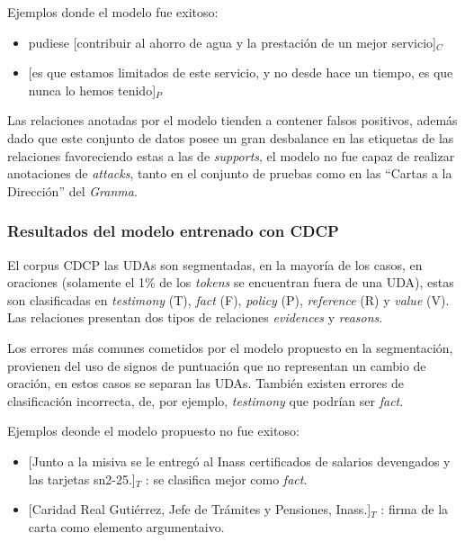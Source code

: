 \documentclass{rcci} %
\begin{document}
Ejemplos donde el modelo fue exitoso:
\begin{itemize}
	\item pudiese [contribuir al ahorro de agua y la prestaci\'on de un mejor servicio]$_C$ %
	\item \text{} [es que estamos limitados de este servicio, y no desde hace un tiempo, es que nunca lo hemos tenido]$_P$ %
\end{itemize}

Las relaciones anotadas por el modelo tienden a contener falsos positivos, adem\'as
dado que este conjunto de datos posee un gran desbalance en las etiquetas de las relaciones favoreciendo 
estas a las de \textit{supports}, el modelo no fue capaz de realizar anotaciones de \textit{attacks}, tanto en 
el conjunto de pruebas como en las ``Cartas a la Direcci\'on'' del \textit{Granma}.

\subsubsection*{Resultados del modelo entrenado con CDCP}

El corpus CDCP las UDAs son segmentadas, en la mayor\'ia de los casos, en oraciones 
(solamente el 1\% de los \textit{tokens} se encuentran fuera de una UDA),
estas son clasificadas en \textit{testimony} (T), \textit{fact} (F), \textit{policy} (P), \textit{reference} (R)
y \textit{value} (V). Las relaciones presentan dos tipos de relaciones \textit{evidences} y \textit{reasons}.

Los errores m\'as comunes cometidos por el modelo propuesto en la segmentaci\'on, provienen del uso 
de signos de puntuaci\'on que no representan un cambio de oraci\'on, en estos casos se separan las UDAs. Tambi\'en
existen errores de clasificaci\'on incorrecta, de, por ejemplo, \textit{testimony} que podr\'ian ser \textit{fact}.

Ejemplos deonde el modelo propuesto no fue exitoso:
\begin{itemize}
	\item \text{} [Junto a la misiva se le entreg\'o al Inass certificados de salarios devengados y las tarjetas sn2-25.]$_T$
	      : se clasifica mejor como \textit{fact}. %
	\item \text{} [Caridad Real Guti\'errez, Jefe de Tr\'amites y Pensiones, Inass.]$_T$
	      : firma de la carta como elemento argumentaivo. %
\end{itemize}
\end{document}
